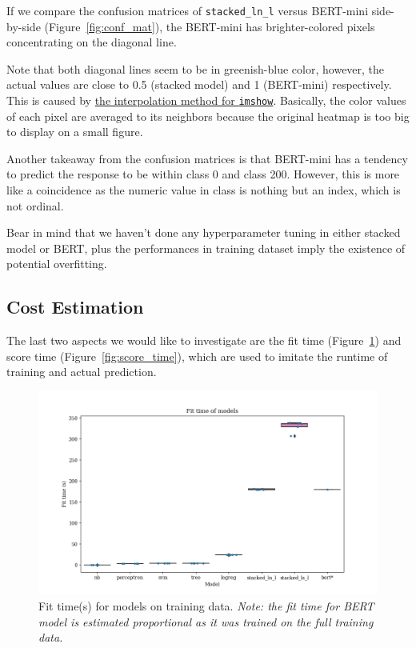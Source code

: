 \documentclass[
	a4paper,
	fontsize=10pt, %
	twoside=false, %
	secnumdepth=2, %
]{kaohandt}
\begin{document}
If we compare the confusion matrices of \texttt{stacked\_ln\_l} versus BERT-mini side-by-side (Figure~\ref{fig:conf_mat}), the BERT-mini has brighter-colored pixels concentrating on the diagonal line.

Note that both diagonal lines seem to be in greenish-blue color, however, the actual values are close to 0.5 (stacked model) and 1 (BERT-mini) respectively. This is caused by \href{https://matplotlib.org/stable/gallery/images_contours_and_fields/interpolation_methods.html}{the interpolation method for \texttt{imshow}}. Basically, the color values of each pixel are averaged to its neighbors because the original heatmap is too big to display on a small figure.

Another takeaway from the confusion matrices is that BERT-mini has a tendency to predict the response to be within class 0 and class 200. However, this is more like a coincidence as the numeric value in class is nothing but an index, which is not ordinal.


Bear in mind that we haven’t done any hyperparameter tuning in either stacked model or BERT, plus the performances in training dataset imply the existence of potential overfitting.

\subsection{Cost Estimation}

The last two aspects we would like to investigate are the fit time (Figure~\ref{fig:fit_time}) and score time (Figure~\ref{fig:score_time}), which are used to imitate the runtime of training and actual prediction.

\begin{figure}[h]
	\includegraphics[]{metric_fit_time.png}
	\caption{Fit time(s) for models on training data. \emph{Note: the fit time for BERT model is estimated proportional as it was trained on the full training data.}}
	\label{fig:fit_time}
\end{figure}
\end{document}

